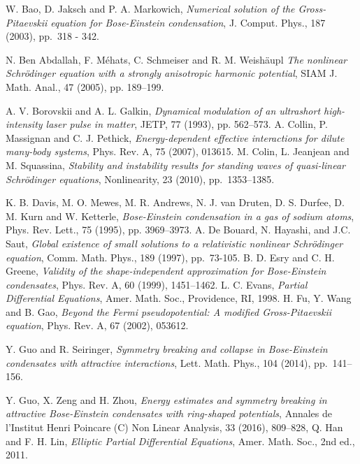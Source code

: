 \documentclass{elsarticle}
\begin{document}
\begin{thebibliography}{}
{\sc W. Bao, D. Jaksch and P. A. Markowich},
\textit{Numerical solution of the Gross-Pitaevskii equation for Bose-Einstein condensation},
J. Comput. Phys., 187 (2003), pp.~318 - 342.





{\sc N. Ben Abdallah, F. M\'ehats, C. Schmeiser and R. M. Weish\"aupl}
\textit{The nonlinear Schr\"odinger equation with a strongly anisotropic harmonic potential},
SIAM J. Math. Anal., 47 (2005), pp. 189--199.

{\sc A. V. Borovskii and A. L. Galkin},
\textit{Dynamical modulation of an ultrashort high-intensity laser
pulse in matter}, JETP, 77 (1993), pp. 562--573.
{\sc A. Collin, P. Massignan and C. J. Pethick},
\textit{Energy-dependent effective interactions for dilute many-body systems},
Phys. Rev. A,  75 (2007), 013615.
{\sc M. Colin, L. Jeanjean and  M. Squassina},
\textit{Stability and instability results for standing waves of quasi-linear Schr\"odinger equations},
Nonlinearity,  23 (2010), pp.~1353--1385.


{\sc K. B. Davis, M. O. Mewes, M. R. Andrews, N. J. van Druten,
 D. S. Durfee, D. M. Kurn and W. Ketterle},
\textit{Bose-Einstein condensation in a gas of sodium atoms}, Phys.
Rev. Lett., 75 (1995), pp. 3969--3973.
{\sc A. De Bouard, N. Hayashi,  and J.C. Saut},
\textit{Global existence of small solutions to a relativistic
nonlinear Schr\"odinger equation},
Comm. Math. Phys., 189 (1997), pp.~73-105.
{\sc B. D. Esry and C. H. Greene},
\textit{Validity of the shape-independent approximation for Bose-Einstein condensates},
Phys. Rev. A,  60 (1999), 1451--1462.
{\sc L. C. Evans},
\textit{Partial Differential Equations},  Amer.
Math. Soc., Providence, RI, 1998.
{\sc H. Fu, Y. Wang and B. Gao},
\textit{Beyond the Fermi pseudopotential: A modified Gross-Pitaevskii equation},
Phys. Rev. A,  67 (2002), 053612.

{\sc Y. Guo and R. Seiringer},
\textit{Symmetry breaking and collapse in Bose-Einstein condensates with attractive interactions},
Lett. Math. Phys., 104 (2014), pp.~141--156.

{\sc Y. Guo, X. Zeng and H. Zhou},
\textit{Energy estimates and symmetry breaking in attractive Bose-Einstein condensates with ring-shaped potentials},
Annales de l'Institut Henri Poincare (C) Non Linear Analysis, 33 (2016),  809--828,
{\sc Q. Han and F. H. Lin},
\textit{Elliptic Partial Differential Equations}, Amer. Math.
Soc., 2nd ed., 2011.


\end{thebibliography}
\end{document}
